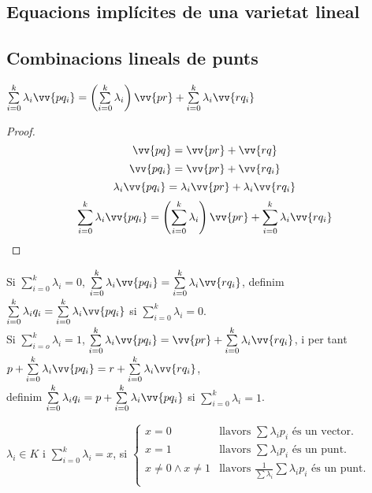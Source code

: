 \subsection{Equacions implícites de una varietat lineal}
\label{ss_eqimvl}

\begin{defn}
	
\end{defn}

\subsection{Combinacions lineals de punts}
\label{ss_comlip}

\begin{lem}
	$\sum\limits_{i=0}^{k}\lambda_{i}\vv{p q_{i}}=\left(\sum\limits_{i=0}^{k}\lambda_{i}\right)\vv{pr}+\sum\limits_{i=0}^{k}\lambda_{i}\vv{r q_{i}}$
\end{lem}
\begin{proof}
	$$\vv{pq}=\vv{pr}+\vv{rq}$$
	$$\vv{p q_{i}}=\vv{pr}+\vv{r q_{i}}$$
	$$\lambda_{i}\vv{p q_{i}}=\lambda_{i}\vv{pr}+\lambda_{i}\vv{r q_{i}}$$
	$$\sum_{i=0}^{k}\lambda_{i}\vv{p q_{i}}=\left(\sum_{i=0}^{k}\lambda_{i}\right)\vv{pr}+\sum_{i=0}^{k}\lambda_{i}\vv{r q_{i}}$$
\end{proof}

\begin{cor}
	Si $\sum\limits_{i=0}^k\lambda_{i}=0$, $\sum\limits_{i=0}^k\lambda_i\vv{pq_i}=\sum\limits_{i=0}^k\lambda_i\vv{rq_i}$, 
	definim $\sum\limits_{i=0}^k\lambda_iq_i=\sum\limits_{i=0}^k\lambda_i\vv{pq_i}$ si $\sum\limits_{i=0}^k\lambda_{i}=0$.\\
	Si $\sum\limits_{i=o}^k\lambda_i=1$, $\sum\limits_{i=0}^k\lambda_i\vv{pq_i}=\vv{pr}+\sum\limits_{i=0}^k\lambda_i\vv{rq_i}$, i per tant $p+\sum\limits_{i=0}^k\lambda_i\vv{pq_i}=r+\sum\limits_{i=0}^k\lambda_i\vv{rq_i}$,\\
	definim $\sum\limits_{i=0}^k\lambda_iq_i=p+\sum\limits_{i=0}^k\lambda_i\vv{pq_i}$ si $\sum\limits_{i=0}^k\lambda_{i}=1$.
\end{cor}

$\lambda_i\in K$ i $\sum\limits_{i=0}^k\lambda_i=x$, si $\left\{\begin{array}{ll}
x=0			& \text{llavors }\sum\lambda_ip_i\text{ és un vector.}				\\
x=1			& \text{llavors }\sum\lambda_ip_i\text{ és un punt.}				\\
x\neq 0\wedge x\neq 1	& \text{llavors }\frac{1}{\sum\lambda_i}\sum\lambda_ip_i\text{ és un punt.}	\\
\end{array}\right.$

